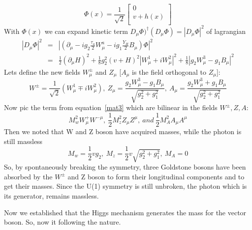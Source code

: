 \begin{equation}
    \Phi (x)=\frac{1}{\sqrt{2}}
        \begin{bmatrix}
        0   \\
        v+h(x)  \\
        \end{bmatrix}
\end{equation}
With $\Phi(x)$ we can expand kinetic term $D_\mu \Phi)^{\dagger} (D_\mu \Phi)=|D_\mu \Phi|^2$ of lagrangian
\begin{eqnarray}\label{mat3}
    |D_{\mu} \Phi|^2 & = & |(\partial_{\mu}-ig_2\frac{\tau_a}{2}W^a_{\mu}-ig_1 \frac{Y_H}{2}B_{\mu})\Phi|^2 \nonumber \\
            & = & \frac{1}{2}(\partial_\mu H)^2+\frac{1}{8}g^2_2(v+H)^2|W^1_{\mu}+iW^2_\mu|^2+\frac{1}{8}|g_2W^3_\mu-g_1B_\mu|^2
\end{eqnarray}
Lets define the new fields $W^{\pm}_\mu$ and $Z_\mu$ [$A_\mu$ is the field orthogonal to $Z_\mu$]:
\begin{equation}
    W^{\pm}=\frac{1}{\sqrt{2}}(W^1_\mu \mp iW^2_\mu),~Z_\mu=\frac{g_2W^3_\mu-g_1B_\mu}{\sqrt{g^2_2+g^2_1}},~A_\mu=\frac{g_2W^3_\mu+g_1B_\mu}{\sqrt{g^2_2+g^2_1}}
\end{equation}
Now pic the term from equation~\ref{mat3} which are bilinear in the fields $W^\pm,Z,A$:
\begin{equation}
    M^2_wW^+_\mu W^{-\mu},~\frac{1}{2}M^2_z Z_\mu Z^\mu,~and~\frac{1}{2}M^2_AA_\mu A^\mu
\end{equation}
Then we noted that W and Z boson have acquired masses, while the photon is still massless
\begin{equation}
    M_w=\frac{1}{2}vg_2,~M_z=\frac{1}{2}v\sqrt{g^2_2+g^2_1},~M_A=0
\end{equation}
So, by spontaneously breaking the symmetry, three Goldstone bosons have been absorbed by the $W^{\pm}$ and Z boson to form their longitudinal components and to get their masses. Since the U(1) symmetry is still unbroken, the photon which is its generator, remains massless.

Now we established that the Higgs mechanism generates the mass for the vector boson. So, now it following the nature.


